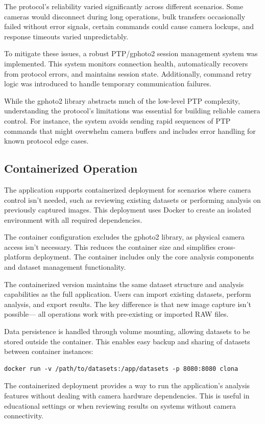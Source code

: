 The protocol's reliability varied significantly across different scenarios. Some cameras would disconnect during long operations, bulk transfers occasionally failed without error signals, certain commands could cause camera lockups, and response timeouts varied unpredictably.

To mitigate these issues, a robust PTP/gphoto2 session management system was implemented. This system monitors connection health, automatically recovers from protocol errors, and maintains session state. Additionally, command retry logic was introduced to handle temporary communication failures.

While the gphoto2 library abstracts much of the low-level PTP complexity, understanding the protocol's limitations was essential for building reliable camera control. For instance, the system avoids sending rapid sequences of PTP commands that might overwhelm camera buffers and includes error handling for known protocol edge cases.

\subsection{Containerized Operation}

The application supports containerized deployment for scenarios where camera control isn't needed, such as reviewing existing datasets or performing analysis on previously captured images. This deployment uses Docker to create an isolated environment with all required dependencies.

The container configuration excludes the gphoto2 library, as physical camera access isn't necessary. This reduces the container size and simplifies cross-platform deployment. The container includes only the core analysis components and dataset management functionality.


The containerized version maintains the same dataset structure and analysis capabilities as the full application. Users can import existing datasets, perform analysis, and export results. The key difference is that new image capture isn't possible— all operations work with pre-existing or imported RAW files.

Data persistence is handled through volume mounting, allowing datasets to be stored outside the container. This enables easy backup and sharing of datasets between container instances:

\begin{verbatim}
docker run -v /path/to/datasets:/app/datasets -p 8080:8080 clona
\end{verbatim}

The containerized deployment provides a way to run the application's analysis features without dealing with camera hardware dependencies. This is useful in educational settings or when reviewing results on systems without camera connectivity.
